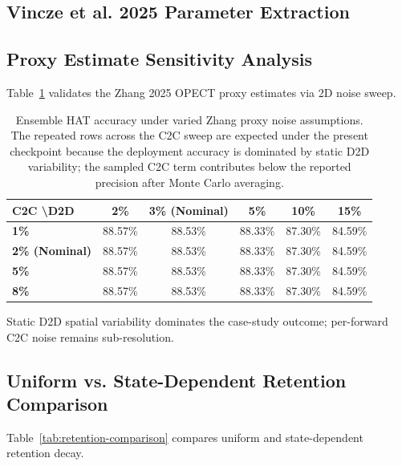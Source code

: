 \FloatBarrier

\subsection{Vincze et al. 2025 Parameter Extraction}
\label{subsec:vincze-extraction}



\subsection{Proxy Estimate Sensitivity Analysis}
\label{subsec:proxy-sensitivity}

Table~\ref{tab:sensitivity} validates the Zhang 2025 OPECT proxy estimates via 2D noise sweep.

\begin{table}[ht]
\centering
\caption{Ensemble HAT accuracy under varied Zhang proxy noise assumptions. The repeated rows across the C2C sweep are expected under the present checkpoint because the deployment accuracy is dominated by static D2D variability; the sampled C2C term contributes below the reported precision after Monte Carlo averaging.}
\label{tab:sensitivity}
\small
\begin{tabular}{lccccc}
\toprule
\textbf{C2C \textbackslash D2D} & \textbf{2\%} & \textbf{3\% (Nominal)} & \textbf{5\%} & \textbf{10\%} & \textbf{15\%} \\
\midrule
\textbf{1\%} & 88.57\% & 88.53\% & 88.33\% & 87.30\% & 84.59\% \\
\textbf{2\% (Nominal)} & 88.57\% & 88.53\% & 88.33\% & 87.30\% & 84.59\% \\
\textbf{5\%} & 88.57\% & 88.53\% & 88.33\% & 87.30\% & 84.59\% \\
\textbf{8\%} & 88.57\% & 88.53\% & 88.33\% & 87.30\% & 84.59\% \\
\bottomrule
\end{tabular}
\end{table}

Static D2D spatial variability dominates the case-study outcome; per-forward C2C noise remains sub-resolution.

\FloatBarrier

\subsection{Uniform vs. State-Dependent Retention Comparison}
\label{subsec:retention-comparison}

Table~\ref{tab:retention-comparison} compares uniform and state-dependent retention decay.

